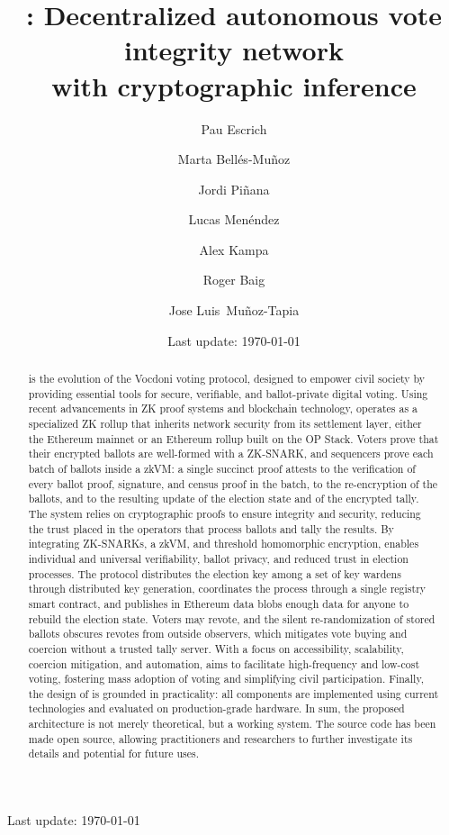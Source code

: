 \documentclass{llncs}
\title{\Davinci: Decentralized autonomous vote integrity network \texorpdfstring{\\ with cryptographic inference}{}}
\author{
	Pau Escrich\inst{1} \and 
	Marta Bellés-Muñoz\inst{2} \and
	Jordi Piñana\inst{1} \and
	Lucas Menéndez\inst{1} \and 
	Alex Kampa\inst{1} \and \linebreak
    Roger Baig\inst{3} \and
	Jose Luis~Muñoz-Tapia\inst{3}
}
\institute{
	Vocdoni Association \and 
	Pompeu Fabra University \and 
	Polytechnic University of Catalonia\\ \vspace{0.2cm}
	\email{\{pau,painan,lucas,alex\}@vocdoni.org},
	\email{marta.belles@upf.edu} \\
	\email{\{roger.baig,jose.luis.munoz\}@upc.edu} 
}
\date{Last update: \today}
\begin{document}
	
\maketitle
\begin{center}\small Last update: \today\end{center}

\pagestyle{plain}
\thispagestyle{plain}


\begin{abstract}
	\Davinci is the evolution of the Vocdoni voting protocol, designed to empower civil society by providing essential tools for secure, verifiable, and ballot-private digital voting. Using recent advancements in \ac{ZK} proof systems and blockchain technology, \davinci operates as a specialized \ac{ZK} rollup that inherits network security from its settlement layer, either the Ethereum mainnet or an Ethereum rollup built on the OP Stack. Voters prove that their encrypted ballots are well-formed with a \ac{ZK-SNARK}, and sequencers prove each batch of ballots inside a \ac{zkVM}: a single succinct proof attests to the verification of every ballot proof, signature, and census proof in the batch, to the re-encryption of the ballots, and to the resulting update of the election state and of the encrypted tally. The system relies on cryptographic proofs to ensure integrity and security, reducing the trust placed in the operators that process ballots and tally the results. By integrating \acsp{ZK-SNARK}, a \ac{zkVM}, and threshold homomorphic encryption, \davinci enables individual and universal verifiability, ballot privacy, and reduced trust in election processes. The protocol distributes the election key among a set of key wardens through distributed key generation, coordinates the process through a single registry smart contract, and publishes in Ethereum data blobs enough data for anyone to rebuild the election state. Voters may revote, and the silent re-randomization of stored ballots obscures revotes from outside observers, which mitigates vote buying and coercion without a trusted tally server. With a focus on accessibility, scalability, coercion mitigation, and automation, \davinci aims to facilitate high-frequency and low-cost voting, fostering mass adoption of voting and simplifying civil participation.
	Finally, the design of \davinci is grounded in practicality: all components are
	implemented using current technologies and evaluated on production-grade hardware. In sum, the proposed architecture is not merely theoretical, but a working system. The source code has been made open source, allowing practitioners and researchers to further investigate its details and potential for future uses.
\end{abstract}
\end{document}
